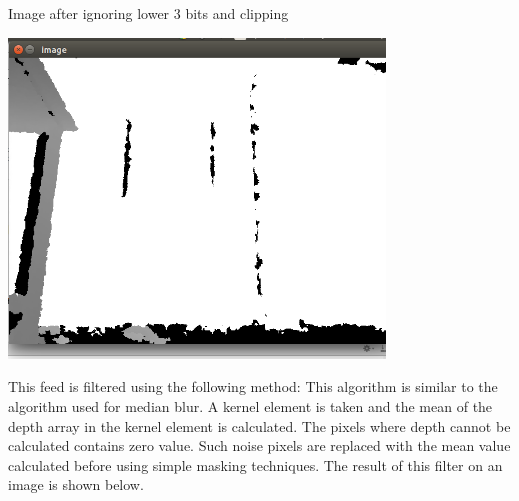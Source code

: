 \documentclass{report}
\begin{document}
Image after ignoring lower 3 bits and clipping \\
\begin{center}
\includegraphics[width = 10cm]{d_3bit.png} \\
\end{center}

This feed is filtered using the following method:
This algorithm is similar to the algorithm used for median blur. A kernel element is taken and the mean of the depth array in the
kernel element is calculated. The pixels where depth cannot be calculated contains zero value. Such noise pixels are replaced
with the mean value calculated before using simple masking techniques. The result of this filter on an image is shown below.\\
\pagebreak
\end{document}
